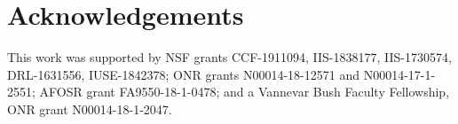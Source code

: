 \documentclass{edm_article}
\begin{document}
\newpage

\section*{Acknowledgements}
This work was supported by
NSF grants CCF-1911094, IIS-1838177, IIS-1730574, DRL-1631556, IUSE-1842378;
ONR grants N00014-18-12571 and N00014-17-1-2551;
AFOSR grant FA9550-18-1-0478; and a
Vannevar Bush Faculty Fellowship, ONR grant N00014-18-1-2047.

%

%
%

\end{document}
